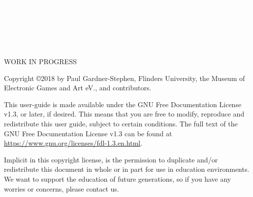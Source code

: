\documentclass{book}
\begin{document}
\sloppy
\hfuzz=5pt




%

\cleardoublepage


  \begin{titlepage}
    \pagecolor{blue}
     \begin{center}
       {
         \large
         \vspace*{2cm}
               {\Huge\textcolor{white}{\bf{MEGA65 USER'S GUIDE}}}\\
             \vspace{\fill}
                    {\textcolor{white}{Published by \\ the MEGA Museum of Electronic Games and Art, Germany.\\and\\Flinders University, Australia.}}
       }
     \end{center}
   \end{titlepage}

  \pagecolor{white}\textcolor{black}
  \vfill
  WORK IN PROGRESS

  Copyright \copyright 2018 by Paul Gardner-Stephen, Flinders University, the Museum of Electronic Games and Art eV., and contributors.

  This user-guide is made available under the GNU Free Documentation License v1.3, or later, if desired. This means that you are free to modify, reproduce
  and redistribute this user guide, subject to certain conditions. The full text of the GNU Free Documentation License v1.3 can be
  found at \url{https://www.gnu.org/licenses/fdl-1.3.en.html}.

  Implicit in this copyright license, is the permission to duplicate and/or redistribute this document in whole or in part for use in
  education environments.  We want to support the education of future generations, so if you have any worries or concerns, please
  contact us.
\end{document}
